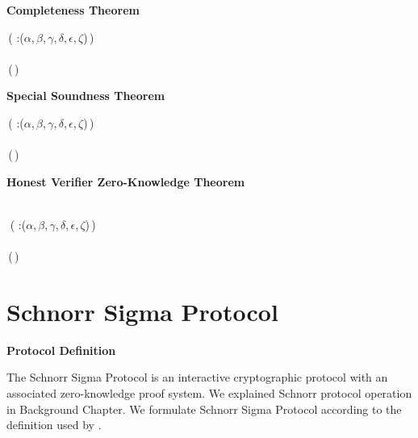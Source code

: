 \textbf{Completeness Theorem}
\begin{holmath}
    \,( :(\ensuremath{\alpha},\,\ensuremath{\beta},\,\ensuremath{\gamma},\,\ensuremath{\delta},\,\ensuremath{\epsilon},\,\ensuremath{\zeta})\,)\,\HOLSymConst{\HOLTokenConj{}}\\
\,\,\HOLSymConst{\HOLTokenImp{}}\\
\,(\,)
\end{holmath}  

\textbf{Special Soundness Theorem}
\begin{holmath}
    \,( :(\ensuremath{\alpha},\,\ensuremath{\beta},\,\ensuremath{\gamma},\,\ensuremath{\delta},\,\ensuremath{\epsilon},\,\ensuremath{\zeta})\,)\,\HOLSymConst{\HOLTokenConj{}}\\
\,\,\HOLSymConst{\HOLTokenImp{}}\\
\,(\,)
\end{holmath}  

\textbf{Honest Verifier Zero-Knowledge Theorem}
\begin{holmath}
    \\
\,\,( :(\ensuremath{\alpha},\,\ensuremath{\beta},\,\ensuremath{\gamma},\,\ensuremath{\delta},\,\ensuremath{\epsilon},\,\ensuremath{\zeta})\,)\,\HOLSymConst{\HOLTokenConj{}}\,\,\,\HOLSymConst{\HOLTokenConj{}}\\
\,\,\HOLSymConst{\HOLTokenImp{}}\\
\,(\,)
\end{holmath}  

\newpage
\section{Schnorr Sigma Protocol}
\textbf{Protocol Definition}

The Schnorr Sigma Protocol is an interactive cryptographic protocol with an associated zero-knowledge proof system. 
We explained Schnorr protocol operation in Background Chapter.
We formulate Schnorr Sigma Protocol according to the definition used by \cite{Haines2019VerifiedVF}.  

